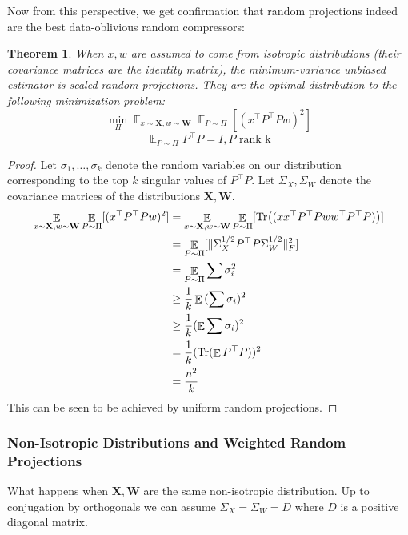 \documentclass{article}
\newtheorem{theorem}{Theorem}[section]
\theoremstyle{definition}
\theoremstyle{plain}
\DeclareMathOperator{\E}{\mathbb{E}}
\DeclarePairedDelimiter\parentheses{\lparen}{\rparen}
\newcommand{\Tr}[1]{\operatorname{Tr} \parentheses*{#1}}
\begin{document}
Now from this perspective, we get confirmation that random projections indeed are the best data-oblivious random compressors:
\begin{theorem}
When $x,w$ are assumed to come from isotropic distributions (their covariance matrices are the identity matrix), the minimum-variance unbiased estimator is scaled random projections. They are the optimal distribution to the following minimization problem:
\[ \min_{\Pi} \E_{x \sim \mathbf{X}, w \sim \mathbf{W}} \E_{P \sim \Pi}[(x^\top P^\top P w)^2] \]
\[ \E_{P \sim \Pi} P^\top P = I, P \text{ rank k} \]
\end{theorem}
\begin{proof}
Let $\sigma_1, \ldots, \sigma_k$ denote the random variables on our distribution corresponding to the top $k$ singular values of $P^\top P$. Let $\Sigma_X, \Sigma_W$ denote the covariance matrices of the distributions $\mathbf{X}, \mathbf{W}$.
\begin{align*}
    \E_{x \sim \mathbf{X}, w \sim \mathbf{W}} \E_{P \sim \Pi}[(x^\top P^\top P w)^2] &= \E_{x \sim \mathbf{X}, w \sim \mathbf{W}} \E_{P \sim \Pi}[\Tr{(xx^\top P^\top P w w^\top P^\top P )}] \\
    &= \E_{P \sim \Pi}[\| \Sigma_X^{1/2} P^\top P \Sigma_W^{1/2}\|_F^2] \\
    &= \E_{P \sim \Pi}{\sum \sigma_i^2} \\
    &\geq\frac{1}{k} \E{(\sum \sigma_i)^2} \\
    &\geq \frac{1}{k} (\E \sum \sigma_i)^2 \\
    &= \frac{1}{k} (\text{Tr}( \E P^\top P))^2 \\
    &= \frac{n^2}{k} \\
\end{align*}
This can be seen to be achieved by uniform random projections.
\end{proof}

\subsubsection*{Non-Isotropic Distributions and Weighted Random Projections} \label{sec:symmetric}
What happens when $\mathbf{X}, \mathbf{W}$ are the same non-isotropic distribution. Up to conjugation by orthogonals we can assume $\Sigma_X = \Sigma_W = D$ where $D$ is a positive diagonal matrix. 
\end{document}
